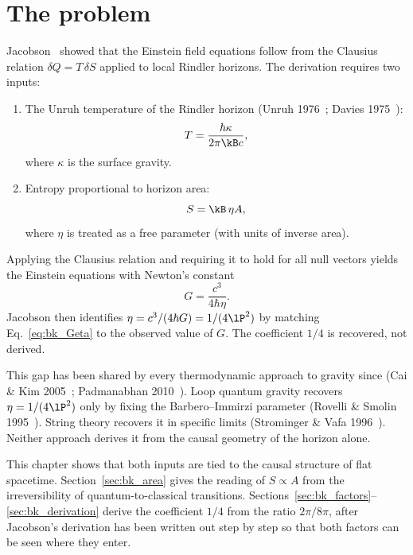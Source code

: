 \section{The problem}\label{sec:bk_problem}
Jacobson~\cite{Jacobson1995} showed that the Einstein field equations follow from the Clausius relation $\delta Q=T\,\delta S$ applied to local
Rindler horizons. The derivation requires two inputs:
\begin{enumerate}
\item The Unruh temperature of the Rindler horizon (Unruh 1976~\cite{Unruh1976}; Davies 1975~\cite{Davies1975}):
\begin{equation}
T=\frac{\hbar\kappa}{2\pi\kB c},\label{eq:bk_unruh}
\end{equation}
where $\kappa$ is the surface gravity.
\item Entropy proportional to horizon area:
\begin{equation}
S=\kB\,\eta A,\label{eq:bk_SetaA}
\end{equation}
where $\eta$ is treated as a free parameter (with units of inverse area).
\end{enumerate}
Applying the Clausius relation and requiring it to hold for all null vectors yields the Einstein equations with Newton's constant
\begin{equation}
G=\frac{c^3}{4\hbar\eta}.\label{eq:bk_Geta}
\end{equation}
Jacobson then identifies $\eta=c^3/(4\hbar G)=1/(4\lP^2)$ by matching Eq.~\eqref{eq:bk_Geta} to the observed value of $G$. The coefficient $1/4$ is recovered,
not derived.

This gap has been shared by every thermodynamic approach to gravity since (Cai \& Kim 2005~\cite{CaiKim2005}; Padmanabhan 2010~\cite{Padmanabhan2010}). Loop quantum gravity
recovers $\eta=1/(4\lP^2)$ only by fixing the Barbero--Immirzi parameter (Rovelli \& Smolin 1995~\cite{RovelliSmolin1995}). String theory recovers it in specific limits
(Strominger \& Vafa 1996~\cite{StromingerVafa1996}). Neither approach derives it from the causal geometry of the horizon alone.

This chapter shows that both inputs are tied to the causal structure of flat spacetime. Section~\ref{sec:bk_area} gives the reading of $S\propto A$ from the
irreversibility of quantum-to-classical transitions. Sections~\ref{sec:bk_factors}--\ref{sec:bk_derivation} derive the coefficient $1/4$ from the ratio $2\pi/8\pi$,
after Jacobson's derivation has been written out step by step so that both factors can be seen where they enter.

